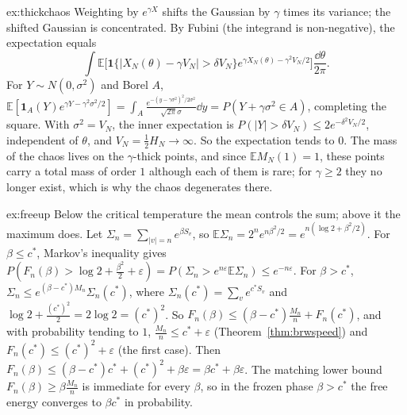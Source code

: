 \begin{solution}{ex:thickchaos}
\idea Weighting by $e^{\gamma X}$ shifts the Gaussian by $\gamma$ times its variance; the shifted Gaussian is concentrated.
\writeup By Fubini (the integrand is non-negative), the expectation equals
\[
\int\mathbb E\bigl[\mathbf 1\{|X_N(\theta)-\gamma V_N|>\delta V_N\}e^{\gamma X_N(\theta)-\gamma^2V_N/2}\bigr]\frac{\dd\theta}{2\pi}.
\]
For $Y\sim N(0,\sigma^2)$ and Borel $A$,
$\mathbb E[\mathbf 1_A(Y)e^{\gamma Y-\gamma^2\sigma^2/2}]=\int_A\frac{e^{-(y-\gamma\sigma^2)^2/2\sigma^2}}{\sqrt{2\pi}\sigma}\dd y=P(Y+\gamma\sigma^2\in A)$, completing the square. With $\sigma^2=V_N$, the inner expectation is $P(|Y|>\delta V_N)\le2e^{-\delta^2V_N/2}$, independent of
$\theta$, and $V_N=\frac12H_N\to\infty$. So the expectation tends to $0$. The mass of the chaos lives on the $\gamma$-thick points, and since $\mathbb EM_N(1)=1$, these points carry a total mass of order $1$ although each of them is rare;
for $\gamma\ge2$ they no longer exist, which is why the chaos degenerates there.
\end{solution}

\begin{solution}{ex:freeup}
\idea Below the critical temperature the mean controls the sum; above it the maximum does.
\writeup Let $\Sigma_n=\sum_{|v|=n}e^{\beta S_v}$, so $\mathbb E\Sigma_n=2^ne^{n\beta^2/2}=e^{n(\log2+\beta^2/2)}$. For $\beta\le c^*$, Markov's inequality gives $P(F_n(\beta)>\log2+\frac{\beta^2}2+\varepsilon)=P(\Sigma_n>e^{n\varepsilon}\mathbb E\Sigma_n)\le e^{-n\varepsilon}$. For $\beta>c^*$,
$\Sigma_n\le e^{(\beta-c^*)M_n}\Sigma_n(c^*)$, where $\Sigma_n(c^*)=\sum_ve^{c^*S_v}$ and $\log2+\frac{(c^*)^2}2=2\log2=(c^*)^2$. So $F_n(\beta)\le(\beta-c^*)\frac{M_n}n+F_n(c^*)$, and with probability tending to $1$, $\frac{M_n}n\le c^*+\varepsilon$
(Theorem~\ref{thm:brwspeed}) and $F_n(c^*)\le(c^*)^2+\varepsilon$ (the first case). Then $F_n(\beta)\le(\beta-c^*)c^*+(c^*)^2+\beta\varepsilon=\beta c^*+\beta\varepsilon$. The matching lower bound $F_n(\beta)\ge\beta\frac{M_n}n$ is immediate for every $\beta$, so in the frozen
phase $\beta>c^*$ the free energy converges to $\beta c^*$ in probability.
\end{solution}

